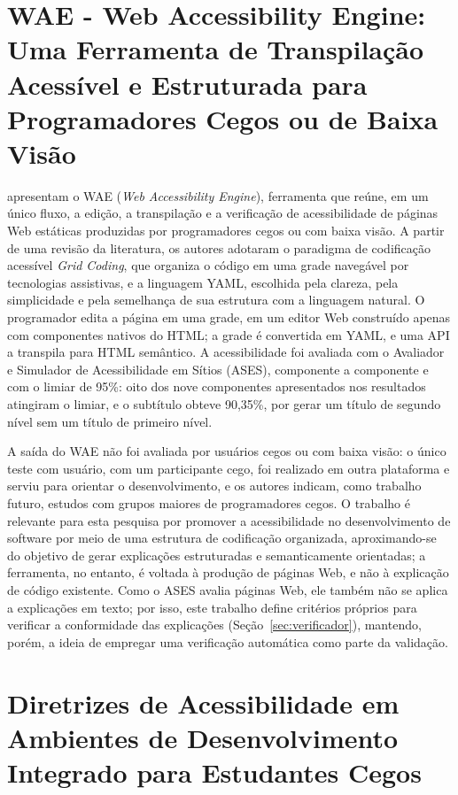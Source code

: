 \documentclass[
    12pt,                   %
    openright,              %
    oneside,                %
    a4paper,                %
    sumario=tradicional,    %
    english,                %
    brazil,                 %
    ]{abntex2}
\begin{document}
\section{WAE - Web Accessibility Engine: Uma Ferramenta de Transpilação Acessível e Estruturada para Programadores Cegos ou de Baixa Visão}

\textcite{latinoware40920} apresentam o WAE (\textit{Web Accessibility Engine}), ferramenta que reúne, em um único fluxo, a edição, a transpilação e a verificação de acessibilidade de páginas Web estáticas produzidas por programadores cegos ou com baixa visão. A partir de uma revisão da literatura, os autores adotaram o paradigma de codificação acessível \textit{Grid Coding}, que organiza o código em uma grade navegável por tecnologias assistivas, e a linguagem YAML, escolhida pela clareza, pela simplicidade e pela semelhança de sua estrutura com a linguagem natural. O programador edita a página em uma grade, em um editor Web construído apenas com componentes nativos do HTML; a grade é convertida em YAML, e uma API a transpila para HTML semântico. A acessibilidade foi avaliada com o Avaliador e Simulador de Acessibilidade em Sítios (ASES), componente a componente e com o limiar de 95\%: oito dos nove componentes apresentados nos resultados atingiram o limiar, e o subtítulo obteve 90,35\%, por gerar um título de segundo nível sem um título de primeiro nível.

A saída do WAE não foi avaliada por usuários cegos ou com baixa visão: o único teste com usuário, com um participante cego, foi realizado em outra plataforma e serviu para orientar o desenvolvimento, e os autores indicam, como trabalho futuro, estudos com grupos maiores de programadores cegos. O trabalho é relevante para esta pesquisa por promover a acessibilidade no desenvolvimento de software por meio de uma estrutura de codificação organizada, aproximando-se do objetivo de gerar explicações estruturadas e semanticamente orientadas; a ferramenta, no entanto, é voltada à produção de páginas Web, e não à explicação de código existente. Como o ASES avalia páginas Web, ele também não se aplica a explicações em texto; por isso, este trabalho define critérios próprios para verificar a conformidade das explicações (Seção~\ref{sec:verificador}), mantendo, porém, a ideia de empregar uma verificação automática como parte da validação.

\section{Diretrizes de Acessibilidade em Ambientes de Desenvolvimento Integrado para Estudantes Cegos}
\end{document}
